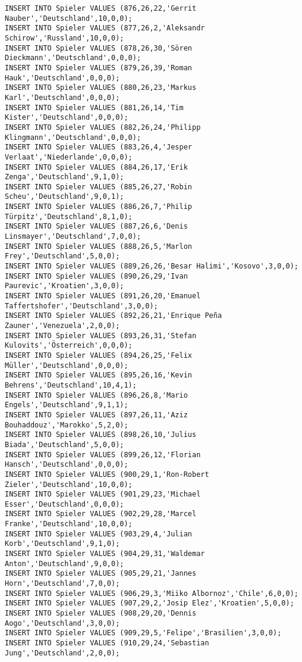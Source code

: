 \documentclass{bschlangaul-aufgabe}
\begin{document}
\begin{verbatim}
INSERT INTO Spieler VALUES (876,26,22,'Gerrit Nauber','Deutschland',10,0,0);
INSERT INTO Spieler VALUES (877,26,2,'Aleksandr Schirow','Russland',10,0,0);
INSERT INTO Spieler VALUES (878,26,30,'Sören Dieckmann','Deutschland',0,0,0);
INSERT INTO Spieler VALUES (879,26,39,'Roman Hauk','Deutschland',0,0,0);
INSERT INTO Spieler VALUES (880,26,23,'Markus Karl','Deutschland',0,0,0);
INSERT INTO Spieler VALUES (881,26,14,'Tim Kister','Deutschland',0,0,0);
INSERT INTO Spieler VALUES (882,26,24,'Philipp Klingmann','Deutschland',0,0,0);
INSERT INTO Spieler VALUES (883,26,4,'Jesper Verlaat','Niederlande',0,0,0);
INSERT INTO Spieler VALUES (884,26,17,'Erik Zenga','Deutschland',9,1,0);
INSERT INTO Spieler VALUES (885,26,27,'Robin Scheu','Deutschland',9,0,1);
INSERT INTO Spieler VALUES (886,26,7,'Philip Türpitz','Deutschland',8,1,0);
INSERT INTO Spieler VALUES (887,26,6,'Denis Linsmayer','Deutschland',7,0,0);
INSERT INTO Spieler VALUES (888,26,5,'Marlon Frey','Deutschland',5,0,0);
INSERT INTO Spieler VALUES (889,26,26,'Besar Halimi','Kosovo',3,0,0);
INSERT INTO Spieler VALUES (890,26,29,'Ivan Paurevic','Kroatien',3,0,0);
INSERT INTO Spieler VALUES (891,26,20,'Emanuel Taffertshofer','Deutschland',3,0,0);
INSERT INTO Spieler VALUES (892,26,21,'Enrique Peña Zauner','Venezuela',2,0,0);
INSERT INTO Spieler VALUES (893,26,31,'Stefan Kulovits','Österreich',0,0,0);
INSERT INTO Spieler VALUES (894,26,25,'Felix Müller','Deutschland',0,0,0);
INSERT INTO Spieler VALUES (895,26,16,'Kevin Behrens','Deutschland',10,4,1);
INSERT INTO Spieler VALUES (896,26,8,'Mario Engels','Deutschland',9,1,1);
INSERT INTO Spieler VALUES (897,26,11,'Aziz Bouhaddouz','Marokko',5,2,0);
INSERT INTO Spieler VALUES (898,26,10,'Julius Biada','Deutschland',5,0,0);
INSERT INTO Spieler VALUES (899,26,12,'Florian Hansch','Deutschland',0,0,0);
INSERT INTO Spieler VALUES (900,29,1,'Ron-Robert Zieler','Deutschland',10,0,0);
INSERT INTO Spieler VALUES (901,29,23,'Michael Esser','Deutschland',0,0,0);
INSERT INTO Spieler VALUES (902,29,28,'Marcel Franke','Deutschland',10,0,0);
INSERT INTO Spieler VALUES (903,29,4,'Julian Korb','Deutschland',9,1,0);
INSERT INTO Spieler VALUES (904,29,31,'Waldemar Anton','Deutschland',9,0,0);
INSERT INTO Spieler VALUES (905,29,21,'Jannes Horn','Deutschland',7,0,0);
INSERT INTO Spieler VALUES (906,29,3,'Miiko Albornoz','Chile',6,0,0);
INSERT INTO Spieler VALUES (907,29,2,'Josip Elez','Kroatien',5,0,0);
INSERT INTO Spieler VALUES (908,29,20,'Dennis Aogo','Deutschland',3,0,0);
INSERT INTO Spieler VALUES (909,29,5,'Felipe','Brasilien',3,0,0);
INSERT INTO Spieler VALUES (910,29,24,'Sebastian Jung','Deutschland',2,0,0);

\end{verbatim}
\end{document}
